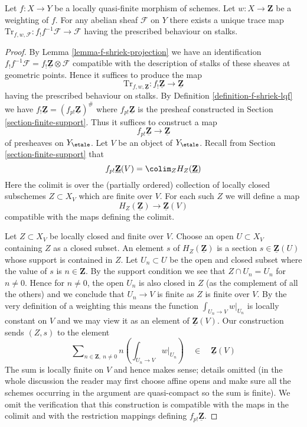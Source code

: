 \begin{lemma}
\label{lemma-trace-map-exists}
Let $f : X \to Y$ be a locally quasi-finite morphism of schemes.
Let $w : X \to \mathbf{Z}$ be a weighting of $f$. For any abelian sheaf
$\mathcal{F}$ on $Y$ there exists a unique trace map
$\text{Tr}_{f, w, \mathcal{F}} : f_!f^{-1}\mathcal{F} \to \mathcal{F}$
having the prescribed behaviour on stalks.
\end{lemma}

\begin{proof}
By Lemma \ref{lemma-f-shriek-projection} we have an identification
$f_!f^{-1}\mathcal{F} = f_!\underline{\mathbf{Z}} \otimes \mathcal{F}$
compatible with the description of stalks of these sheaves at
geometric points. Hence it suffices to produce the map
$$
\text{Tr}_{f, w, \underline{\mathbf{Z}}} :
f_!\underline{\mathbf{Z}}
\longrightarrow
\underline{\mathbf{Z}}
$$
having the prescribed behaviour on stalks. By
Definition \ref{definition-f-shriek-lqf} we have
$f_!\underline{\mathbf{Z}} = (f_{p!}\underline{\mathbf{Z}})^\#$
where $f_{p!}\underline{\mathbf{Z}}$ is the presheaf
constructed in Section \ref{section-finite-support}.
Thus it suffices to construct a map
$$
f_{p!}\underline{\mathbf{Z}} \longrightarrow \underline{\mathbf{Z}}
$$
of presheaves on $Y_\etale$. Let $V$ be an object of $Y_\etale$.
Recall from Section \ref{section-finite-support} that
$$
f_{p!}\underline{\mathbf{Z}}(V) = \colim_Z H_Z(\underline{\mathbf{Z}})
$$
Here the colimit is over the (partially ordered) collection of locally closed
subschemes $Z \subset X_V$ which are finite over $V$. For each such
$Z$ we will define a map
$$
H_Z(\underline{\mathbf{Z}}) \longrightarrow \underline{\mathbf{Z}}(V)
$$
compatible with the maps defining the colimit.

\medskip\noindent
Let $Z \subset X_V$ be locally closed and finite over $V$.
Choose an open $U \subset X_V$ containing $Z$ as a closed subset.
An element $s$ of $H_Z(\underline{\mathbf{Z}})$ is a section
$s \in \underline{\mathbf{Z}}(U)$ whose support is contained in $Z$.
Let $U_n \subset U$ be the open and closed subset where the value
of $s$ is $n \in \mathbf{Z}$. By the support condition we see that
$Z \cap U_n = U_n$ for $n \not = 0$. Hence for $n \not = 0$, the open
$U_n$ is also closed in $Z$ (as the complement of all the others)
and we conclude that $U_n \to V$ is finite as $Z$ is finite over $V$.
By the very definition of a weighting this means the
function $\int_{U_n \to V} w|_{U_n}$ is locally constant on $V$
and we may view it as an element of $\underline{\mathbf{Z}}(V)$.
Our construction sends $(Z, s)$ to the element
$$
\sum\nolimits_{n \in \mathbf{Z},\ n \not = 0}
n \left(\int_{U_n \to V} w|_{U_n}\right)
\quad \in \quad \underline{\mathbf{Z}}(V)
$$
The sum is locally finite on $V$ and hence makes sense; details omitted
(in the whole discussion the reader may first choose affine opens and
make sure all the schemes occurring in the argument are quasi-compact so
the sum is finite). We omit the verification that this construction
is compatible with the maps in the colimit and with the restriction
mappings defining $f_{p!}\underline{\mathbf{Z}}$.


\end{proof}
